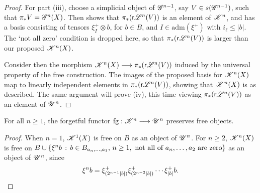 \documentclass[11pt]{article}
\newcommand{\RestLie}[1]{\mathsf{r}{\scrL}^{#1}}%
\newcommand{\LL}[1]{{\scrK}^{#1}}%
\newcommand{\GR}[1]{\scrG^{#1}}%
\newcommand{\nontop}[1]{\scrU^{#1}}%
\newcommand{\admis}[1]{\mathrm{adm}(#1)}%
\newcommand{\iteratedrestn}[2]{\xi^{#2}{#1}}
\newcommand{\forget}{\mathrm{fg}}
\newcommand{\Fr}[1]{#1}%
\newcommand{\LambdaOp}{\xi^{+}}
\begin{document}
\begin{CategoriesOfInterest}
\begin{proof}
For part (iii), choose a simplicial object of $\GR{n-1}$, say $V\in s(\GR{n-1})$, such that $\pi_{*}V=\Fr{\GR{n}}(X)$. Then \cite[Thm 8.6, Thm 8.8]{CurtisSimplicialHtpy.pdf} shows that $\pi_*(\Fr{\RestLie{n}}(V))$ is an element of $\LL{n}$, and has a basis consisting of tensors $\LambdaOp_{I}\otimes b$, for $b\in B$, and $I\in\admis{\LambdaOp}$ with $i_\ell\leq|b|$. The `not all zero' condition is dropped here, so that $\pi_*(\Fr{\RestLie{n}}(V))$ is larger than our proposed $\LL{n}(X)$.

Consider then the morphism $\Fr{\LL{n}}(X)\to \pi_*(\Fr{\RestLie{n}}(V))$ induced by the universal property of the free construction. The images of the proposed basis for $\Fr{\LL{n}}(X)$ map to linearly independent elements in $\pi_*(\Fr{\RestLie{n}}(V))$, showing that $\Fr{\LL{n}}(X)$ is as described. The same argument will prove (iv), this time viewing $\pi_*(\Fr{\RestLie{n}}(V))$ as an element of $\nontop{n}$.
\end{proof}
\begin{cor*}
For all $n\geq 1$, the forgetful functor $\forget:\LL{n}\to\nontop{n}$ preserves free objects.
\end{cor*}
\begin{proof}
When $n=1$, $\Fr{\LL{1}}(X)$ is free on $B$ as an object of $\nontop{n}$. For $n\geq2$, $\Fr{\LL{n}}(X)$  is free on $B\cup \{\iteratedrestn{b}{n}\,:\,b\in B_{a_{n},\ldots,a_1},\,n\geq1,\textup{ not all of $a_n,\ldots,a_2$ are zero}\}$ as an object of $\nontop{n}$, since
\[\iteratedrestn{b}{n}=\LambdaOp_{(2^{n-1}|b|)}\LambdaOp_{(2^{n-2}|b|)}\cdots \LambdaOp_{|b|}b.\qedhere\]

\end{proof}
\end{CategoriesOfInterest}
\end{document}
